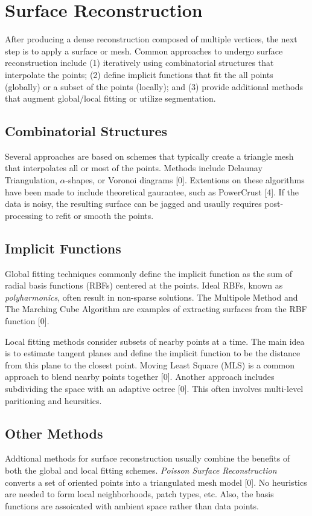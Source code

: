 \documentclass[10pt,twocolumn,letterpaper]{article}
\begin{document}
\section{Surface Reconstruction}
After producing a dense reconstruction composed of multiple vertices, the next step is to apply a surface or mesh.  Common approaches to undergo surface reconstruction include (1) iteratively using combinatorial structures that interpolate the points; (2) define implicit functions that fit the all points (globally) or a subset of the points (locally); and (3) provide additional methods that augment global/local fitting or utilize segmentation.


\subsection{Combinatorial Structures}
Several approaches are based on schemes that typically create a triangle mesh that interpolates all or most of the points.  Methods include Delaunay Triangulation, $\alpha$-shapes, or Voronoi diagrams [0].  Extentions on these algorithms have been made to include theoretical gaurantee, such as PowerCrust [4].  If the data is noisy, the resulting surface can be jagged and usaully requires post-processing to refit or smooth the points.

\subsection{Implicit Functions}
Global fitting techniques commonly define the implicit function as the sum of radial basis functions (RBFs) centered at the points.  Ideal RBFs, known as \textit{polyharmonics}, often result in non-sparse solutions.  The Multipole Method and The Marching Cube Algorithm are examples of extracting surfaces from the RBF function [0].

Local fitting methods consider subsets of nearby points at a time.  The main idea is to estimate tangent planes and define the implicit function to be the distance from this plane to the closest point. Moving Least Square (MLS) is a common approach to blend nearby points together [0].  Another approach includes subdividing the space with an adaptive octree [0].  This often involves multi-level paritioning and heursitics.

\subsection{Other Methods}
Addtional methods for surface reconstruction usually combine the benefits of both the global and local fitting schemes.  \textit{Poisson Surface Reconstruction} converts a set of oriented points into a triangulated mesh model [0].  No heuristics are needed to form local neighborhoods, patch types, etc.  Also, the basis functions are assoicated with ambient space rather than data points.
\end{document}
